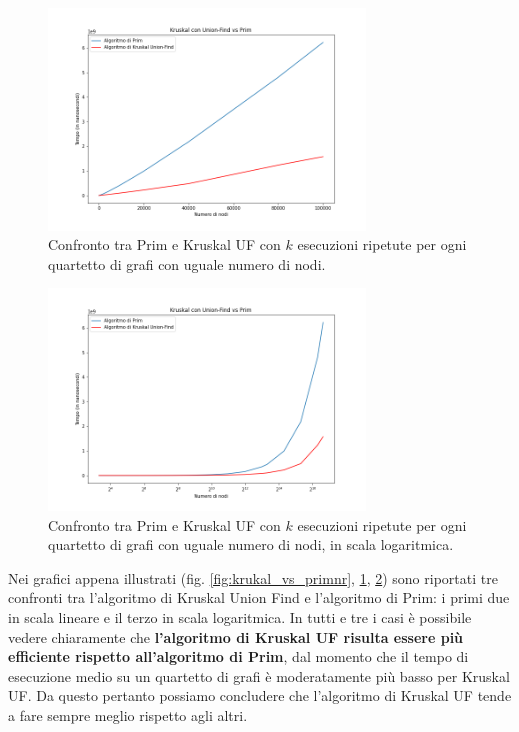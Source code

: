 \begin{figure}[H]
	\centering
	\includegraphics[width=0.75\textwidth]{res/images/graph-complexity/kruskal_uf_vs_prim.png}
	\caption{Confronto tra Prim e Kruskal UF con \(k\) esecuzioni ripetute per ogni quartetto di grafi con uguale numero di nodi.}
    \label{fig:krukal_vs_prim}
\end{figure}

\begin{figure}[H]
	\centering
	\includegraphics[width=0.75\textwidth]{res/images/graph-log/kruskal_uf_vs_prim_scala_logaritmica.png}
	\caption{Confronto tra Prim e Kruskal UF con \(k\) esecuzioni ripetute per ogni quartetto di grafi con uguale numero di nodi, in scala logaritmica.}
	\label{fig:kruskal_vs_primlog}
\end{figure}


Nei grafici appena illustrati (fig. \ref{fig:krukal_vs_primnr}, \ref{fig:krukal_vs_prim}, \ref{fig:kruskal_vs_primlog}) sono riportati tre confronti tra l'algoritmo di Kruskal Union Find e l'algoritmo di Prim: i primi due in scala lineare e il terzo in scala logaritmica. In tutti e tre i casi è possibile vedere chiaramente che \textbf{l'algoritmo di Kruskal UF risulta essere più efficiente rispetto all'algoritmo di Prim}, dal momento che il tempo di esecuzione medio su un quartetto di grafi è moderatamente più basso per Kruskal UF. Da questo pertanto possiamo concludere che l'algoritmo di Kruskal UF tende a fare sempre meglio rispetto agli altri.
